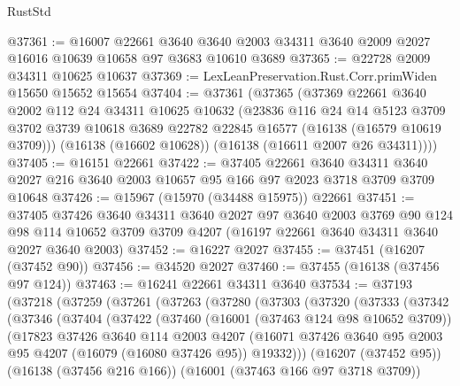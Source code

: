 \begin{lexlean}{RustStd}
\begin{coremodule}
@37361 := @16007
    @22661
    @3640
    @3640
    @2003
    @34311
    @3640
    @2009
    @2027
    @16016
    @10639
    @10658
    @97
    @3683
    @10610
    @3689
@37365 := @22728 @2009 @34311 @10625 @10637
@37369 := LexLeanPreservation.Rust.Corr.primWiden @15650 @15652 @15654
@37404 := @37361
    (@37365
      (@37369
        @22661
        @3640
        @2002
        @112
        @24
        @34311
        @10625
        @10632
        (@23836
          @116
          @24
          @14
          @5123
          @3709
          @3702
          @3739
          @10618
          @3689
          @22782
          @22845
          @16577
          (@16138 (@16579 @10619 @3709)))
        (@16138 (@16602 @10628))
        (@16138 (@16611 @2007 @26 @34311))))
@37405 := @16151 @22661
@37422 := @37405
    @22661
    @3640
    @34311
    @3640
    @2027
    @216
    @3640
    @2003
    @10657
    @95
    @166
    @97
    @2023
    @3718
    @3709
    @3709
    @10648
@37426 := @15967 (@15970 (@34488 @15975)) @22661
@37451 := @37405
    @37426
    @3640
    @34311
    @3640
    @2027
    @97
    @3640
    @2003
    @3769
    @90
    @124
    @98
    @114
    @10652
    @3709
    @3709
    @4207
    (@16197 @22661 @3640 @34311 @3640 @2027 @3640 @2003)
@37452 := @16227 @2027
@37455 := @37451 (@16207 (@37452 @90))
@37456 := @34520 @2027
@37460 := @37455 (@16138 (@37456 @97 @124))
@37463 := @16241 @22661 @34311 @3640
@37534 := @37193
    (@37218
      (@37259
        (@37261
          (@37263
            (@37280
              (@37303
                (@37320
                  (@37333
                    (@37342
                      (@37346
                        (@37404
                          (@37422
                            (@37460
                              (@16001 (@37463 @124 @98 @10652 @3709))
                              (@17823
                                @37426
                                @3640
                                @114
                                @2003
                                @4207
                                (@16071
                                  @37426
                                  @3640
                                  @95
                                  @2003
                                  @95
                                  @4207
                                  (@16079 (@16080 @37426 @95))
                                  @19332)))
                            (@16207 (@37452 @95))
                            (@16138 (@37456 @216 @166))
                            (@16001 (@37463 @166 @97 @3718 @3709))

\end{coremodule}
\end{lexlean}
